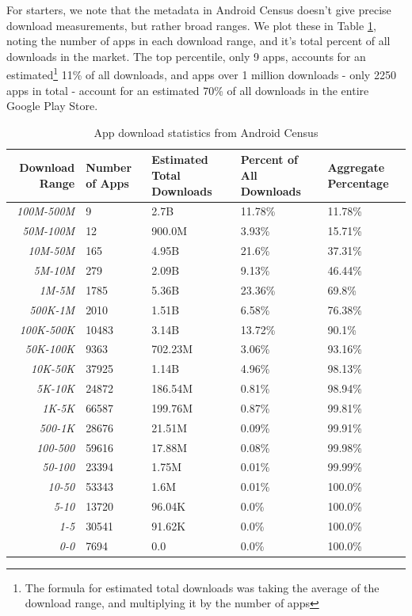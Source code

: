 For starters, we note that the metadata in Android Census doesn't give precise download measurements, but rather broad ranges. We plot these in Table \ref{tab:downloadstats}, noting the number of apps in each download range, and it's total percent of all downloads in the market. The top percentile, only 9 apps, accounts for an estimated\footnote{The formula for estimated total downloads was taking the average of the download range, and multiplying it by the number of apps} 11\% of all downloads, and apps over 1 million downloads - only 2250 apps in total - account for an estimated 70\% of all downloads in the entire Google Play Store.

\begin{table}[t]
\begin{small}
\begin{tabular}{r|llll}
Download Range & Number of Apps & Estimated Total Downloads & Percent of All Downloads & Aggregate Percentage \\
\hline

\textit{100M-500M} & 9 & 2.7B & 11.78\% & 11.78\% \\
\textit{50M-100M} & 12 & 900.0M & 3.93\% & 15.71\% \\
\textit{10M-50M} & 165 & 4.95B & 21.6\% & 37.31\% \\
\textit{5M-10M} & 279 & 2.09B & 9.13\% & 46.44\% \\
\textit{1M-5M} & 1785 & 5.36B & 23.36\% & 69.8\% \\
\textit{500K-1M} & 2010 & 1.51B & 6.58\% & 76.38\% \\
\textit{100K-500K} & 10483 & 3.14B & 13.72\% & 90.1\% \\
\textit{50K-100K} & 9363 & 702.23M & 3.06\% & 93.16\% \\
\textit{10K-50K} & 37925 & 1.14B & 4.96\% & 98.13\% \\
\textit{5K-10K} & 24872 & 186.54M & 0.81\% & 98.94\% \\
\textit{1K-5K} & 66587 & 199.76M & 0.87\% & 99.81\% \\
\textit{500-1K} & 28676 & 21.51M & 0.09\% & 99.91\% \\
\textit{100-500} & 59616 & 17.88M & 0.08\% & 99.98\% \\
\textit{50-100} & 23394 & 1.75M & 0.01\% & 99.99\% \\
\textit{10-50} & 53343 & 1.6M & 0.01\% & 100.0\% \\
\textit{5-10} & 13720 & 96.04K & 0.0\% & 100.0\% \\
\textit{1-5} & 30541 & 91.62K & 0.0\% & 100.0\% \\
\textit{0-0} & 7694 & 0.0 & 0.0\% & 100.0\% \\

\end{tabular}
\end{small}
\caption{App download statistics from Android Census}
\label{tab:downloadstats}
\end{table}

